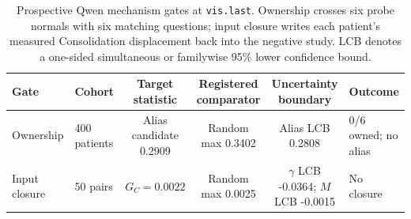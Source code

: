 \begin{table}[t]
\centering
\scriptsize
\setlength{\tabcolsep}{3.0pt}
\caption{Prospective Qwen mechanism gates at \texttt{vis.last}. Ownership crosses six probe normals with six matching questions; input closure writes each patient's measured Consolidation displacement back into the negative study. LCB denotes a one-sided simultaneous or familywise 95\% lower confidence bound.}
\label{tab:mechanisms}
\begin{tabular*}{\textwidth}{@{\extracolsep{\fill}}llcccl@{}}
\toprule
Gate & Cohort & Target statistic & Registered comparator & Uncertainty boundary & Outcome \\
\midrule
Ownership & 400 patients & Alias candidate 0.2909 & Random max 0.3402 & Alias LCB 0.2808 & 0/6 owned; no alias \\
Input closure & 50 pairs & $G_C=0.0022$ & Random max 0.0025 & $\gamma$ LCB -0.0364; $M$ LCB -0.0015 & No closure \\
\bottomrule
\end{tabular*}
\end{table}
